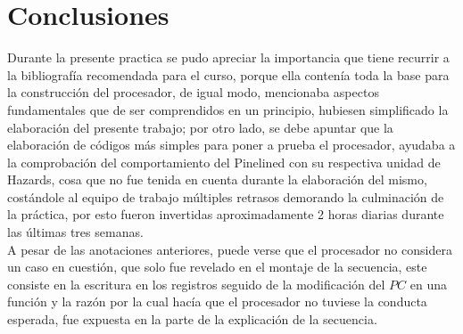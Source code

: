 \section*{Conclusiones} 
Durante la presente practica se pudo apreciar la importancia que tiene recurrir a la bibliografía recomendada para el curso, porque ella contenía toda la base para la construcción del procesador, de igual modo, mencionaba aspectos fundamentales que de ser comprendidos en un principio, hubiesen simplificado la elaboración del presente trabajo; por otro lado, se debe apuntar que la elaboración de códigos más simples para poner a prueba el procesador, ayudaba a la comprobación del comportamiento del Pinelined con su respectiva unidad de Hazards, cosa que no fue tenida en cuenta durante la elaboración del mismo, costándole al equipo de trabajo múltiples retrasos demorando la culminación de la práctica, por esto fueron invertidas aproximadamente 2 horas diarias durante las últimas tres semanas.\\
A pesar de las anotaciones anteriores, puede verse que el procesador no considera un caso en cuestión, que solo fue revelado en el montaje de la secuencia, este consiste en la escritura en los registros seguido de la modificación del $PC$ en una función y la razón por la cual hacía que el procesador no tuviese la conducta esperada, fue expuesta en la parte de la explicación de la secuencia.\\

